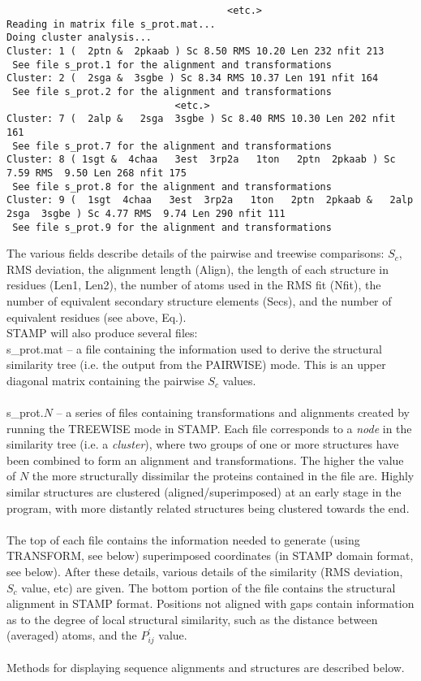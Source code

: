 \begin{scriptsize}
\begin{verbatim}
                                      <etc.>
Reading in matrix file s_prot.mat...
Doing cluster analysis...
Cluster: 1 (  2ptn &  2pkaab ) Sc 8.50 RMS 10.20 Len 232 nfit 213 
 See file s_prot.1 for the alignment and transformations
Cluster: 2 (  2sga &  3sgbe ) Sc 8.34 RMS 10.37 Len 191 nfit 164 
 See file s_prot.2 for the alignment and transformations
                             <etc.>    
Cluster: 7 (  2alp &   2sga  3sgbe ) Sc 8.40 RMS 10.30 Len 202 nfit 161 
 See file s_prot.7 for the alignment and transformations
Cluster: 8 ( 1sgt &  4chaa   3est  3rp2a   1ton   2ptn  2pkaab ) Sc 7.59 RMS  9.50 Len 268 nfit 175 
 See file s_prot.8 for the alignment and transformations
Cluster: 9 (  1sgt  4chaa   3est  3rp2a   1ton   2ptn  2pkaab &   2alp   2sga  3sgbe ) Sc 4.77 RMS  9.74 Len 290 nfit 111 
 See file s_prot.9 for the alignment and transformations
\end{verbatim} \end{scriptsize}

The various fields describe details of the pairwise and treewise
comparisons: $S_{c}$, RMS deviation, the alignment length (Align),
the length of each structure in residues (Len1, Len2), the number of
atoms used in the RMS fit (Nfit), the number of equivalent secondary
structure elements (Secs), and the number of equivalent residues
(see above, Eq.).\\

STAMP will also produce several files: \\

s\_prot.mat -- a file containing the information used to derive the 
structural similarity tree (i.e. the output from the PAIRWISE) mode.  This
is an upper diagonal matrix containing the pairwise $S_{c}$ values.\\
\\
s\_prot.$N$ -- a series of files containing transformations and alignments 
created by running the TREEWISE mode in STAMP.  Each file corresponds to 
a {\em node} in the similarity tree (i.e. a {\em cluster}), where two 
groups of one or more structures have been combined to form an
alignment and transformations.  The higher the value of $N$ the more 
structurally dissimilar the proteins contained in the file are.  Highly 
similar structures are clustered (aligned/superimposed) at an early stage 
in the program, with more distantly related structures being clustered 
towards the end.\\
\\
The top of each file contains the information needed to generate (using
TRANSFORM, see below)
superimposed coordinates (in STAMP domain format, see below). 
After these details, various details of the similarity (RMS deviation, 
$S_{c}$ value, etc) are given.  The bottom portion of the file contains 
the structural alignment in STAMP format.  Positions not aligned with 
gaps contain information as to the degree of local structural similarity, 
such as the distance between (averaged) \Cal atoms, and the 
$P_{ij}^{\prime}$ value.\\
\\
Methods for displaying sequence alignments and structures are described below.

